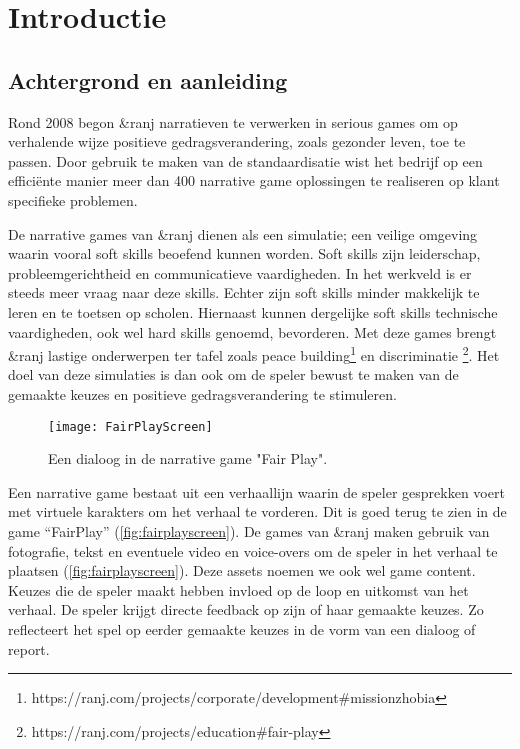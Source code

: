 \chapter{Introductie}
\label{ch:introduction}

\section{Achtergrond en aanleiding}
Rond 2008 begon \&ranj narratieven te verwerken in serious games om op verhalende wijze positieve gedragsverandering, zoals gezonder leven, toe te passen. Door gebruik te maken van de standaardisatie wist het bedrijf op een efficiënte manier meer dan 400 narrative game oplossingen te realiseren op klant specifieke problemen.

De narrative games van \&ranj dienen als een simulatie; een veilige omgeving waarin vooral soft skills beoefend kunnen worden. Soft skills zijn leiderschap, probleemgerichtheid en communicatieve vaardigheden. In het werkveld is er steeds meer vraag naar deze skills\cite{Gibert2017}\cite{Hirsch2017}\cite{Robles2012}. Echter zijn soft skills minder makkelijk te leren en te toetsen op scholen\cite{BishnuMurti2014}. Hiernaast kunnen dergelijke soft skills technische vaardigheden, ook wel hard skills genoemd, bevorderen\cite{Schulz2008}. Met deze games brengt \&ranj lastige onderwerpen ter tafel zoals peace building\footnote{https://ranj.com/projects/corporate/development\#missionzhobia} en discriminatie \footnote{https://ranj.com/projects/education\#fair-play}. Het doel van deze simulaties is dan ook om de speler bewust te maken van de gemaakte keuzes en positieve gedragsverandering te stimuleren.

\begin{wrapfigure}{r}{0.4\textwidth}
    \texttt{[image: FairPlayScreen]}
    \caption{Een dialoog in de narrative game "Fair Play".}
    \label{fig:fairplayscreen}
    \centering
\end{wrapfigure}

Een narrative game bestaat uit een verhaallijn waarin de speler gesprekken voert met virtuele karakters om het verhaal te vorderen. Dit is goed terug te zien in de game “FairPlay” (\autoref{fig:fairplayscreen}). De games van \&ranj maken gebruik van fotografie, tekst en eventuele video en voice-overs om de speler in het verhaal te plaatsen (\autoref{fig:fairplayscreen}). Deze assets noemen we ook wel game content. Keuzes die de speler maakt hebben invloed op de loop en uitkomst van het verhaal. De speler krijgt directe feedback op zijn of haar gemaakte keuzes. Zo reflecteert het spel op eerder gemaakte keuzes in de vorm van een dialoog of report.

